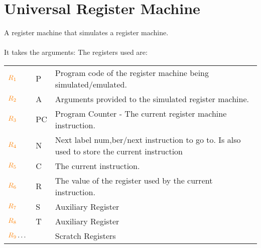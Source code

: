 \documentclass{report}
\begin{document}
\section*{Universal Register Machine}
A register machine that simulates a register machine.
\\
\\ It takes the arguments:
The registers used are:
\begin{center}
	\begin{tabular}{l l p{}}
		$\text{\textcolor{orange}{$R_{1}$}}$      & P  & Program code of the register machine being simulated/emulated.                              \\
		$\text{\textcolor{orange}{$R_{2}$}}$      & A  & Arguments provided to the simulated register machine.                                       \\
		$\text{\textcolor{orange}{$R_{3}$}}$      & PC & Program Counter - The current register machine instruction.                                 \\
		$\text{\textcolor{orange}{$R_{4}$}}$      & N  & Next label num,ber/next instruction to go to. Is also used to store the current instruction \\
		$\text{\textcolor{orange}{$R_{5}$}}$      & C  & The current instruction.                                                                    \\
		$\text{\textcolor{orange}{$R_{6}$}}$      & R  & The value of the register used by the current instruction.                                  \\
		$\text{\textcolor{orange}{$R_{7}$}}$      & S  & Auxiliary Register                                                                          \\
		$\text{\textcolor{orange}{$R_{8}$}}$      & T  & Auxiliary Register                                                                          \\
		$\text{\textcolor{orange}{$R_{9}$}}\dots$ &    & Scratch Registers                                                                           \\
	\end{tabular}
\end{center}
\end{document}
